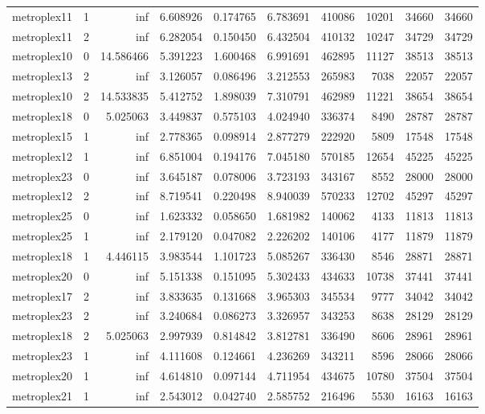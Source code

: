 \begin{longtable}{|l|r|r|r|r|r|r|r|r|r|}
metroplex11 & 1 & inf & 6.608926 & 0.174765 & 6.783691 & 410086 & 10201 & 34660 & 34660 \\
metroplex11 & 2 & inf & 6.282054 & 0.150450 & 6.432504 & 410132 & 10247 & 34729 & 34729 \\
metroplex10 & 0 & 14.586466 & 5.391223 & 1.600468 & 6.991691 & 462895 & 11127 & 38513 & 38513 \\
metroplex13 & 2 & inf & 3.126057 & 0.086496 & 3.212553 & 265983 & 7038 & 22057 & 22057 \\
metroplex10 & 2 & 14.533835 & 5.412752 & 1.898039 & 7.310791 & 462989 & 11221 & 38654 & 38654 \\
metroplex18 & 0 & 5.025063 & 3.449837 & 0.575103 & 4.024940 & 336374 & 8490 & 28787 & 28787 \\
metroplex15 & 1 & inf & 2.778365 & 0.098914 & 2.877279 & 222920 & 5809 & 17548 & 17548 \\
metroplex12 & 1 & inf & 6.851004 & 0.194176 & 7.045180 & 570185 & 12654 & 45225 & 45225 \\
metroplex23 & 0 & inf & 3.645187 & 0.078006 & 3.723193 & 343167 & 8552 & 28000 & 28000 \\
metroplex12 & 2 & inf & 8.719541 & 0.220498 & 8.940039 & 570233 & 12702 & 45297 & 45297 \\
metroplex25 & 0 & inf & 1.623332 & 0.058650 & 1.681982 & 140062 & 4133 & 11813 & 11813 \\
metroplex25 & 1 & inf & 2.179120 & 0.047082 & 2.226202 & 140106 & 4177 & 11879 & 11879 \\
metroplex18 & 1 & 4.446115 & 3.983544 & 1.101723 & 5.085267 & 336430 & 8546 & 28871 & 28871 \\
metroplex20 & 0 & inf & 5.151338 & 0.151095 & 5.302433 & 434633 & 10738 & 37441 & 37441 \\
metroplex17 & 2 & inf & 3.833635 & 0.131668 & 3.965303 & 345534 & 9777 & 34042 & 34042 \\
metroplex23 & 2 & inf & 3.240684 & 0.086273 & 3.326957 & 343253 & 8638 & 28129 & 28129 \\
metroplex18 & 2 & 5.025063 & 2.997939 & 0.814842 & 3.812781 & 336490 & 8606 & 28961 & 28961 \\
metroplex23 & 1 & inf & 4.111608 & 0.124661 & 4.236269 & 343211 & 8596 & 28066 & 28066 \\
metroplex20 & 1 & inf & 4.614810 & 0.097144 & 4.711954 & 434675 & 10780 & 37504 & 37504 \\
metroplex21 & 1 & inf & 2.543012 & 0.042740 & 2.585752 & 216496 & 5530 & 16163 & 16163 \\

\end{longtable}
